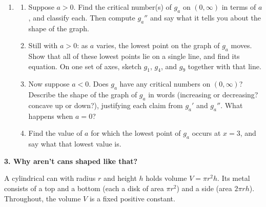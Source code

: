 \documentclass[11pt]{article}
\newcommand{\prob}[1]{\medskip\noindent\textbf{\large #1}\par\smallskip}
\begin{document}
\begin{enumerate}[resume]
\item[]
\begin{enumerate}
\item Suppose $a>0$. Find the critical number(s) of $g_a$ on $(0,\infty)$ in terms of $a$,
and classify each. Then compute $g_a''$ and say what it tells you about the shape of the
graph.

\item Still with $a>0$: as $a$ varies, the lowest point on the graph of $g_a$ moves.
Show that all of these lowest points lie on a single line, and find its equation. On one
set of axes, sketch $g_1$, $g_4$, and $g_9$ together with that line.

\item Now suppose $a<0$. Does $g_a$ have any critical numbers on $(0,\infty)$? Describe
the shape of the graph of $g_a$ in words (increasing or decreasing? concave up or down?),
justifying each claim from $g_a'$ and $g_a''$. What happens when $a=0$?

\item Find the value of $a$ for which the lowest point of $g_a$ occurs at $x=3$, and say
what that lowest value is.
\end{enumerate}
\end{enumerate}

\prob{3. Why aren't cans shaped like that?}

A cylindrical can with radius $r$ and height $h$ holds volume $V=\pi r^2h$. Its metal
consists of a top and a bottom (each a disk of area $\pi r^2$) and a side (area $2\pi
rh$). Throughout, the volume $V$ is a fixed positive constant.
\end{document}
